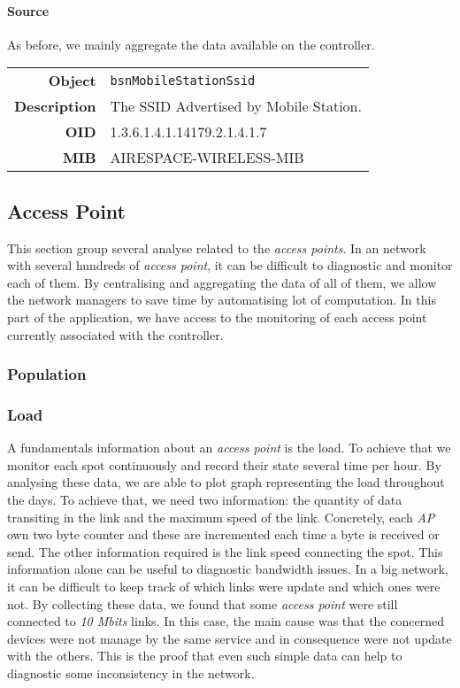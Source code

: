 \paragraph*{Source} As before, we mainly aggregate the data available on the controller.

\begin{tabular}{|r l|}
\hline
\textbf{Object} & \texttt{bsnMobileStationSsid} \\
\textbf{Description} & \parbox{11cm}{The SSID Advertised by Mobile Station.} \\
\textbf{OID} & 1.3.6.1.4.1.14179.2.1.4.1.7 \\
\textbf{MIB} & AIRESPACE-WIRELESS-MIB \\
\hline
\end{tabular}

\subsection{Access Point}
This section group several analyse related to the \emph{access points}. In an network with several hundreds of \emph{access point}, it can be difficult to diagnostic and monitor each of them. By centralising and aggregating the data of all of them, we allow the network managers to save time by automatising lot of computation. In this part of the application, we have access to the monitoring of each access point currently associated with the controller.
\subsubsection{Population}

\subsubsection*{Load}
A fundamentals information about an \emph{access point} is the load. To achieve that we monitor each spot continuously and record their state several time per hour. By analysing these data, we are able to plot graph representing the load throughout the days. To achieve that, we need two information: the quantity of data transiting in the link and the maximum speed of the link. Concretely, each \emph{AP} own two byte counter and these are incremented each time a byte is received or send. The other information required is the link speed connecting the spot. This information alone can be useful to diagnostic bandwidth issues. In a big network, it can be difficult to keep track of which links were update and which ones were not. By collecting these data, we found that some \emph{access point} were still connected to \emph{10 Mbits} links. In this case, the main cause was that the concerned devices were not manage by the same service and in consequence were not update with the others. This is the proof that even such simple data can help to diagnostic some inconsistency in the network.

